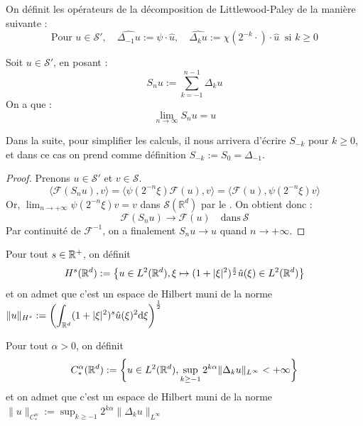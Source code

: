 \documentclass[11pt,a4paper]{article}
\begin{document}
\begin{defin}
On définit les opérateurs de la décomposition de Littlewood-Paley de la manière suivante :
\[
\text{Pour } u \in \mathcal{S}', \quad \widehat{\Delta_{-1} u} := \psi \cdot \hat{u}, \quad \widehat{\Delta_{k} u} := \chi(2^{-k} \cdot) \cdot \hat{u} \ \text{ si } k \geq 0
\]
\end{defin}

\begin{prop}
Soit $u \in \mathcal{S}'$, en posant :
\[ S_n u := \sum_{k=-1}^{n-1} \Delta_k u \]
On a que :
\[ \lim_{n \to \infty} S_n u = u \]
\end{prop}
\begin{rmq}
Dans la suite, pour simplifier les calculs, il nous arrivera d'écrire $S_{-k}$ pour $k\geq 0$, et dans ce cas on prend comme définition $S_{-k} := S_{0} = \Delta_{-1}$.
\end{rmq}

\begin{proof}
Prenons $u \in \mathcal{S}'$ et $v \in \mathcal{S}$.
\[ \langle \mathcal{F}(S_n u), v \rangle = \langle \psi(2^{-n}\xi) \mathcal{F}(u), v \rangle = \langle \mathcal{F}(u), \psi(2^{-n}\xi) v \rangle \]
Or, $\lim_{n \to +\infty} \psi(2^{-n}\xi)v = v$ dans $\mathcal{S}(\mathbb{R}^d)$ par le . On obtient donc :
\[ \mathcal{F}(S_n u) \to \mathcal{F}(u) \quad \text{dans} \ \mathcal{S} \]
Par continuité de $\mathcal{F}^{-1}$, on a finalement $S_n u \to u$ quand $n \to +\infty$.
\end{proof}
     
     
\begin{defin}
Pour tout $s\in \mathbb R^+$, on définit 
\begin{equation*}
H^s(\mathbb R^d) := \left\{ u\in L^2(\mathbb R^d), \xi \mapsto (1+|\xi|^2)^{\frac{s}{2}}\hat{u}(\xi) \in L^2(\mathbb R^d) \right\}
\end{equation*}
et on admet que c'est un espace de Hilbert muni de la norme $\|u\|_{H^s} := \displaystyle \left(\int_{\mathbb R^d} (1+|\xi|^2)^s\hat{u}(\xi)^2\mathrm{d}\xi \right)^\frac{1}{2}$
\end{defin}


\begin{defin}
Pour tout $\alpha > 0$, on définit 
\begin{equation*}
C^\alpha_*(\mathbb R^d) := \left\{ u\in L^2(\mathbb R^d), \sup_{k \geq -1} 2^{k\alpha}\|\Delta_ku\|_{L^\infty} < +\infty \right\}
\end{equation*}
et on admet que c'est un espace de Hilbert muni de la norme $\|u\|_{C^\alpha_*} :=  \sup_{k \geq -1} 2^{k\alpha}\|\Delta_ku\|_{L^\infty} $
\end{defin}
\end{document}
